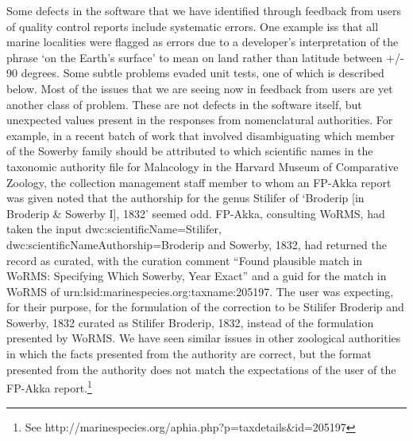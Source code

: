 \documentclass{article}
\begin{document}
Some defects in the software that we have identified through feedback from users of quality control reports include systematic errors. One example iss that all marine localities were flagged as errors due to a developer's interpretation of the phrase `on the Earth's surface' to mean on land rather than latitude between +/- 90 degrees.
Some subtle problems evaded unit tests, one of which is described below.
Most of the issues that we are seeing now in feedback from users are yet another class of problem. These are not defects in the software itself, but unexpected values present in the responses from nomenclatural authorities.  For example, in a recent batch of work that involved disambiguating which member of the Sowerby family should be attributed to which scientific names in the taxonomic authority file for Malacology in the Harvard Museum of Comparative Zoology, the collection management staff member to whom an FP-Akka report was given noted that the authorship for the genus Stilifer of `Broderip [in Broderip \& Sowerby I], 1832' seemed odd.  FP-Akka, consulting WoRMS, had taken the input dwc:scientificName=Stilifer, dwc:scientificNameAuthorship=Broderip and Sowerby, 1832, had returned the record as curated, with the curation comment ``Found plausible match in WoRMS: Specifying Which Sowerby, Year Exact'' and a guid for the match in WoRMS of urn:lsid:marinespecies.org:taxname:205197.  The user was expecting, for their purpose, for the formulation of the correction to be Stilifer Broderip and Sowerby, 1832 curated as Stilifer Broderip, 1832, instead of the formulation presented by WoRMS.  We have seen similar issues in other zoological authorities in which the facts presented from the authority are correct, but the format presented from the authority does not match the expectations of the user of the FP-Akka report.\footnote{See http://marinespecies.org/aphia.php?p=taxdetails\&id=205197}
\end{document}
